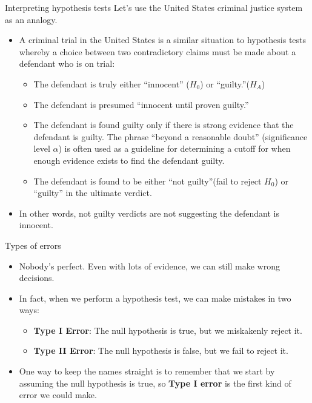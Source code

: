 \documentclass[
  ignorenonframetext,
]{beamer}
\providecommand{\tightlist}{%
  \setlength{\itemsep}{0pt}\setlength{\parskip}{0pt}}
\begin{document}
\begin{frame}{Interpreting hypothesis tests}
\protect\hypertarget{interpreting-hypothesis-tests-2}{}
Let's use the United States criminal justice system as an analogy.

\begin{itemize}
\item
  A criminal trial in the United States is a similar situation to
  hypothesis tests whereby a choice between two contradictory claims
  must be made about a defendant who is on trial:

  \begin{itemize}
  \tightlist
  \item
    The defendant is truly either ``innocent'' (\(H_0\)) or
    ``guilty.''(\(H_A\))
  \item
    The defendant is presumed ``innocent until proven guilty.''
  \item
    The defendant is found guilty only if there is strong evidence that
    the defendant is guilty. The phrase ``beyond a reasonable doubt''
    (significance level \(\alpha\)) is often used as a guideline for
    determining a cutoff for when enough evidence exists to find the
    defendant guilty.
  \item
    The defendant is found to be either ``not guilty''(fail to reject
    \(H_0\)) or ``guilty'' in the ultimate verdict.
  \end{itemize}
\item
  In other words, not guilty verdicts are not suggesting the defendant
  is innocent.
\end{itemize}
\end{frame}

\begin{frame}{Types of errors}
\protect\hypertarget{types-of-errors}{}
\begin{itemize}
\item
  Nobody's perfect. Even with lots of evidence, we can still make wrong
  decisions.
\item
  In fact, when we perform a hypothesis test, we can make mistakes in
  two ways:

  \begin{itemize}
  \tightlist
  \item
    \textbf{Type I Error}: The null hypothesis is true, but we
    miskakenly reject it.
  \item
    \textbf{Type II Error}: The null hypothesis is false, but we fail to
    reject it.
  \end{itemize}
\item
  One way to keep the names straight is to remember that we start by
  assuming the null hypothesis is true, so \textbf{Type I error} is the
  first kind of error we could make.
\end{itemize}
\end{frame}
\end{document}

